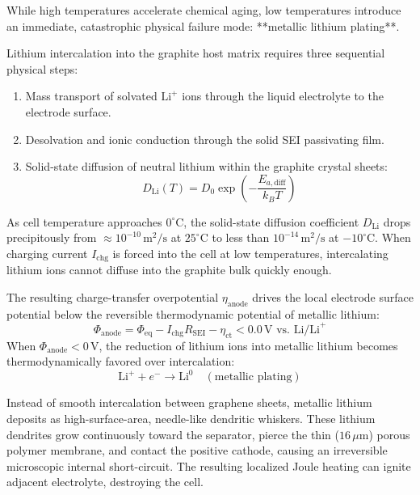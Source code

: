 While high temperatures accelerate chemical aging, low temperatures introduce an immediate, catastrophic physical failure mode: **metallic lithium plating**.

Lithium intercalation into the graphite host matrix requires three sequential physical steps:
\begin{enumerate}
    \item Mass transport of solvated $\mathrm{Li}^+$ ions through the liquid electrolyte to the electrode surface.
    \item Desolvation and ionic conduction through the solid SEI passivating film.
    \item Solid-state diffusion of neutral lithium within the graphite crystal sheets:
    \begin{equation}
    D_{\mathrm{Li}}(T) = D_0 \exp\left( -\frac{E_{a,\mathrm{diff}}}{k_B T} \right)
    \label{eq:solid_diffusion}
    \end{equation}
\end{enumerate}

As cell temperature approaches $0^\circ\mathrm{C}$, the solid-state diffusion coefficient $D_{\mathrm{Li}}$ drops precipitously from $\approx 10^{-10}\,\mathrm{m^2/s}$ at $25^\circ\mathrm{C}$ to less than $10^{-14}\,\mathrm{m^2/s}$ at $-10^\circ\mathrm{C}$. When charging current $I_{\mathrm{chg}}$ is forced into the cell at low temperatures, intercalating lithium ions cannot diffuse into the graphite bulk quickly enough. 

The resulting charge-transfer overpotential $\eta_{\mathrm{anode}}$ drives the local electrode surface potential below the reversible thermodynamic potential of metallic lithium:
\begin{equation}
\Phi_{\mathrm{anode}} = \Phi_{\mathrm{eq}} - I_{\mathrm{chg}} R_{\mathrm{SEI}} - \eta_{\mathrm{ct}} < 0.0\,\mathrm{V} \text{ vs. } \mathrm{Li/Li}^+
\label{eq:plating_potential}
\end{equation}
When $\Phi_{\mathrm{anode}} < 0\,\mathrm{V}$, the reduction of lithium ions into metallic lithium becomes thermodynamically favored over intercalation:
\begin{equation}
\mathrm{Li}^+ + e^- \longrightarrow \mathrm{Li}^0 \quad (\text{metallic plating})
\label{eq:metallic_plating}
\end{equation}

Instead of smooth intercalation between graphene sheets, metallic lithium deposits as high-surface-area, needle-like dendritic whiskers. These lithium dendrites grow continuously toward the separator, pierce the thin ($16\,\mu\mathrm{m}$) porous polymer membrane, and contact the positive cathode, causing an irreversible microscopic internal short-circuit. The resulting localized Joule heating can ignite adjacent electrolyte, destroying the cell.

